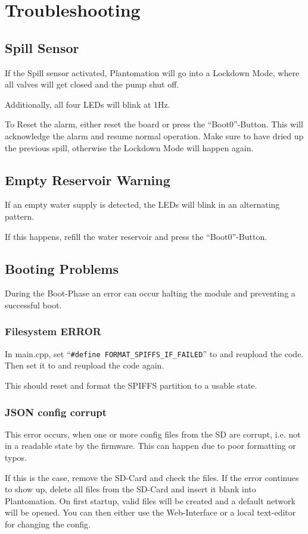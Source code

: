\chapter{Troubleshooting}
\section{Spill Sensor}
If the Spill sensor activated, Plantomation will go into a Lockdown Mode, where all valves will get closed and the pump shut off. 

Additionally, all four LEDs will blink at 1Hz. 

To Reset the alarm, either reset the board or press the ``Boot0''-Button. This will acknowledge the alarm and resume normal operation. Make sure to have dried up the previous spill, otherwise the Lockdown Mode will happen again.

\section{Empty Reservoir Warning}
If an empty water supply is detected, the LEDs will blink in an alternating pattern. 

If this happens, refill the water reservoir and press the ``Boot0''-Button.

\section{Booting Problems}
During the Boot-Phase an error can occur halting the module and preventing a successful boot. 

\subsection{Filesystem ERROR}
In main.cpp, set ``\lstinline{#define FORMAT_SPIFFS_IF_FAILED}'' to  and reupload the code. 
Then set it to  and reupload the code again. 

This should reset and format the SPIFFS partition to a usable state. 

\subsection{JSON config corrupt}
This error occurs, when one or more config files from the SD are corrupt, i.e. not in a readable state by the firmware. This can happen due to poor formatting or typos. 

If this is the case, remove the SD-Card and check the files. If the error continues to show up, delete all files from the SD-Card and insert it blank into Plantomation. On first startup, valid files will be created and a default network will be opened. You can then either use the Web-Interface or a local text-editor for changing the config. 